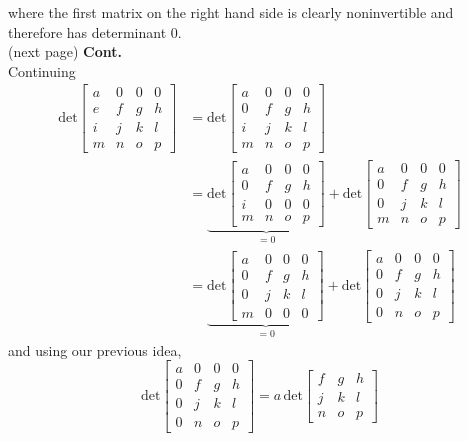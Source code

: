 \documentclass{report}
\begin{document}
where the first matrix on the right hand side is clearly noninvertible and therefore has determinant 0.\\
(next page)\newpage
\noindent\textbf{Cont.}\\
Continuing 
\begin{align*}
\text{det}\left[\begin{array}{cccc}
a&0&0&0\\
e&f&g&h\\
i&j&k&l\\
m&n&o&p
\end{array}\right]&=\text{det}\left[\begin{array}{cccc}
a&0&0&0\\
0&f&g&h\\
i&j&k&l\\
m&n&o&p
\end{array}\right]\\
&=\underbrace{\text{det}\left[\begin{array}{cccc}
a&0&0&0\\
0&f&g&h\\
i&0&0&0\\
m&n&o&p
\end{array}\right]}_{=0}+\text{det}\left[\begin{array}{cccc}
a&0&0&0\\
0&f&g&h\\
0&j&k&l\\
m&n&o&p
\end{array}\right]\\
&=\underbrace{\text{det}\left[\begin{array}{cccc}
a&0&0&0\\
0&f&g&h\\
0&j&k&l\\
m&0&0&0
\end{array}\right]}_{=0}+\text{det}\left[\begin{array}{cccc}
a&0&0&0\\
0&f&g&h\\
0&j&k&l\\
0&n&o&p
\end{array}\right]
\end{align*}
and using our previous idea,
\begin{equation*}
\text{det}\left[\begin{array}{cccc}
a&0&0&0\\
0&f&g&h\\
0&j&k&l\\
0&n&o&p
\end{array}\right]=a\,\text{det}\left[\begin{array}{ccc}
f&g&h\\
j&k&l\\
n&o&p
\end{array}\right]
\end{equation*}
\end{document}
